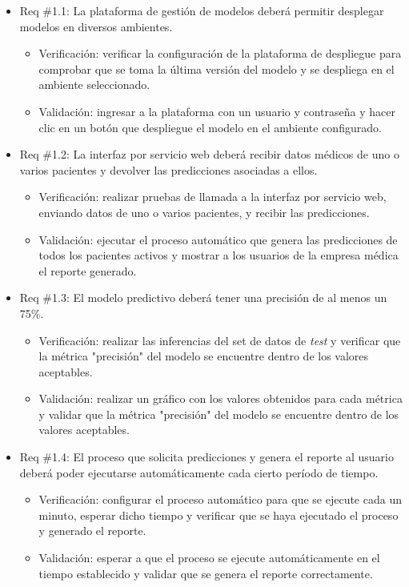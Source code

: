 \documentclass[
11pt, %
]{charter}
\begin{document}
\begin{itemize}
	\item Req \#1.1: La plataforma de gestión de modelos deberá permitir desplegar modelos en diversos ambientes.
	\begin{itemize}
		\item Verificación: verificar la configuración de la plataforma de despliegue para comprobar que se toma la última versión del modelo y se despliega en el ambiente seleccionado.
		\item Validación: ingresar a la plataforma con un usuario y contraseña y hacer clic en un botón que despliegue el modelo en el ambiente configurado. 
	\end{itemize}
	\item Req \#1.2: La interfaz por servicio web deberá recibir datos médicos de uno o varios pacientes y devolver las predicciones asociadas a ellos.	
	\begin{itemize}
		\item Verificación: realizar pruebas de llamada a la interfaz por servicio web, enviando datos de uno o varios pacientes, y recibir las predicciones.
		\item Validación: ejecutar el proceso automático que genera las predicciones de todos los pacientes activos y mostrar a los usuarios de la empresa médica el reporte generado.
	\end{itemize}			
	\item Req \#1.3: El modelo predictivo deberá tener una precisión de al menos un 75\%.
	\begin{itemize}
		\item Verificación: realizar las inferencias del set de datos de \textit{test} y verificar que la métrica "precisión" del modelo se encuentre dentro de los valores aceptables.
		\item Validación: realizar un gráfico con los valores obtenidos para cada métrica y validar que la métrica "precisión" del modelo se encuentre dentro de los valores aceptables.
	\end{itemize}
	\item Req \#1.4: El proceso que solicita predicciones y genera el reporte al usuario deberá poder ejecutarse automáticamente cada cierto período de tiempo.		
	\begin{itemize}
		\item Verificación: configurar el proceso automático para que se ejecute cada un minuto, esperar dicho tiempo y verificar que se haya ejecutado el proceso y generado el reporte.
		\item Validación: esperar a que el proceso se ejecute automáticamente en el tiempo establecido y validar que se genera el reporte correctamente.

\end{itemize}
\end{itemize}
\end{document}
